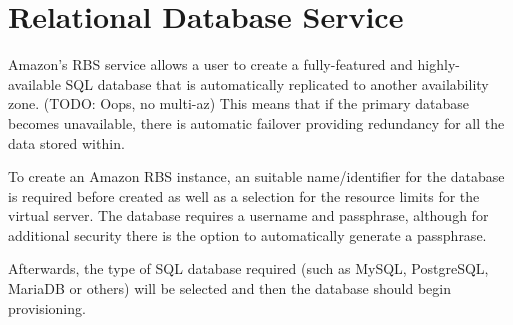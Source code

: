 \chapter{Relational Database Service}\label{ch:relational-database-service}
Amazon’s RBS service allows a user to create a fully-featured and highly-available SQL database that is automatically replicated to another availability zone. (TODO: Oops, no multi-az) This means that if the primary database becomes unavailable, there is automatic failover providing redundancy for all the data stored within.

To create an Amazon RBS instance, an suitable name/identifier for the database is required before created as well as a selection for the resource limits for the virtual server. The database requires a username and passphrase, although for additional security there is the option to automatically generate a passphrase.

Afterwards, the type of SQL database required (such as MySQL, PostgreSQL, MariaDB or others) will be selected and then the database should begin provisioning.